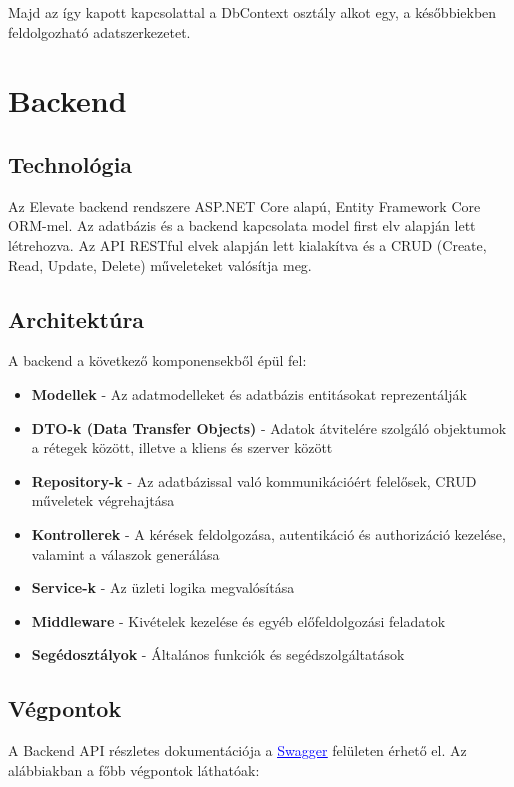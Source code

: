\documentclass[12pt]{report}
\begin{document}
Majd az így kapott kapcsolattal a DbContext osztály alkot egy, a későbbiekben feldolgozható adatszerkezetet.

\chapter{Backend}

\section{Technológia}
Az Elevate backend rendszere ASP.NET Core alapú, Entity Framework Core ORM-mel. Az adatbázis és a backend kapcsolata model first elv alapján lett létrehozva. Az API RESTful elvek alapján lett kialakítva és a CRUD (Create, Read, Update, Delete) műveleteket valósítja meg.

\section{Architektúra}
A backend a következő komponensekből épül fel:
\begin{itemize}
  \item \textbf{Modellek} - Az adatmodelleket és adatbázis entitásokat reprezentálják
  \item \textbf{DTO-k (Data Transfer Objects)} - Adatok átvitelére szolgáló objektumok a rétegek között, illetve a kliens és szerver között
  \item \textbf{Repository-k} - Az adatbázissal való kommunikációért felelősek, CRUD műveletek végrehajtása
  \item \textbf{Kontrollerek} - A kérések feldolgozása, autentikáció és authorizáció kezelése, valamint a válaszok generálása
  \item \textbf{Service-k} - Az üzleti logika megvalósítása
  \item \textbf{Middleware} - Kivételek kezelése és egyéb előfeldolgozási feladatok
  \item \textbf{Segédosztályok} - Általános funkciók és segédszolgáltatások
\end{itemize}

\section{Végpontok}
A Backend API részletes dokumentációja a \href{https://elevate-backend.koyeb.app/swagger}{\textcolor{blue}{\underline{Swagger}}} felületen érhető el. Az alábbiakban a főbb végpontok láthatóak:
\end{document}
